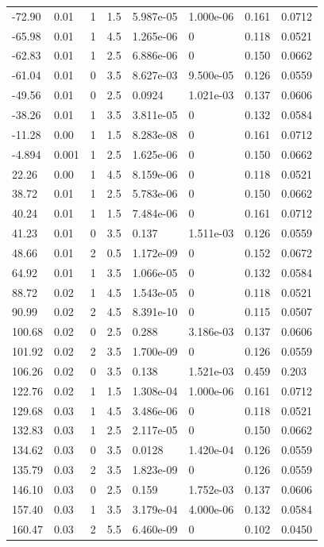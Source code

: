 \documentclass[preview]{standalone}
\begin{document}
{{\begin{tabular}{L{1.2cm}C{1.2cm} C{0.3cm}C{0.5cm} C{1.4cm}C{1.4cm} C{1.4cm}C{1.4cm}}
  -72.90  &  0.01  & 1     & 1.5 &  5.987e-05  & 1.000e-06  & 0.161 &  0.0712   \\ 
  -65.98  &  0.01  & 1     & 4.5 &  1.265e-06  & 0  & 0.118 &  0.0521   \\ 
  -62.83  &  0.01  & 1     & 2.5 &  6.886e-06  & 0  & 0.150 &  0.0662   \\ 
  -61.04  &  0.01  & 0     & 3.5 &  8.627e-03  & 9.500e-05  & 0.126 &  0.0559   \\ 
  -49.56  &  0.01  & 0     & 2.5 &  0.0924  & 1.021e-03  & 0.137 &  0.0606   \\ 
  -38.26  &  0.01  & 1     & 3.5 &  3.811e-05  & 0  & 0.132 &  0.0584   \\ 
  -11.28  &  0.00  & 1     & 1.5 &  8.283e-08  & 0  & 0.161 &  0.0712   \\ 
  -4.894  &  0.001  & 1     & 2.5 &  1.625e-06  & 0  & 0.150 &  0.0662   \\ 
  22.26  &  0.00  & 1     & 4.5 &  8.159e-06  & 0  & 0.118 &  0.0521   \\ 
  38.72  &  0.01  & 1     & 2.5 &  5.783e-06  & 0  & 0.150 &  0.0662   \\ 
  40.24  &  0.01  & 1     & 1.5 &  7.484e-06  & 0  & 0.161 &  0.0712   \\ 
  41.23  &  0.01  & 0     & 3.5 &  0.137  & 1.511e-03  & 0.126 &  0.0559   \\ 
  48.66  &  0.01  & 2     & 0.5 &  1.172e-09  & 0  & 0.152 &  0.0672   \\ 
  64.92  &  0.01  & 1     & 3.5 &  1.066e-05  & 0  & 0.132 &  0.0584   \\ 
  88.72  &  0.02  & 1     & 4.5 &  1.543e-05  & 0  & 0.118 &  0.0521   \\ 
  90.99  &  0.02  & 2     & 4.5 &  8.391e-10  & 0  & 0.115 &  0.0507   \\ 
  100.68  &  0.02  & 0     & 2.5 &  0.288  & 3.186e-03  & 0.137 &  0.0606   \\ 
  101.92  &  0.02  & 2     & 3.5 &  1.700e-09  & 0  & 0.126 &  0.0559   \\ 
  106.26  &  0.02  & 0     & 3.5 &  0.138  & 1.521e-03  & 0.459 &  0.203   \\ 
  122.76  &  0.02  & 1     & 1.5 &  1.308e-04  & 1.000e-06  & 0.161 &  0.0712   \\ 
  129.68  &  0.03  & 1     & 4.5 &  3.486e-06  & 0  & 0.118 &  0.0521   \\ 
  132.83  &  0.03  & 1     & 2.5 &  2.117e-05  & 0  & 0.150 &  0.0662   \\ 
  134.62  &  0.03  & 0     & 3.5 &  0.0128  & 1.420e-04  & 0.126 &  0.0559   \\ 
  135.79  &  0.03  & 2     & 3.5 &  1.823e-09  & 0  & 0.126 &  0.0559   \\ 
  146.10  &  0.03  & 0     & 2.5 &  0.159  & 1.752e-03  & 0.137 &  0.0606   \\ 
  157.40  &  0.03  & 1     & 3.5 &  3.179e-04  & 4.000e-06  & 0.132 &  0.0584   \\ 
  160.47  &  0.03  & 2     & 5.5 &  6.460e-09  & 0  & 0.102 &  0.0450   \\ 
\hline 
\end{tabular} 

}}
\end{document}
